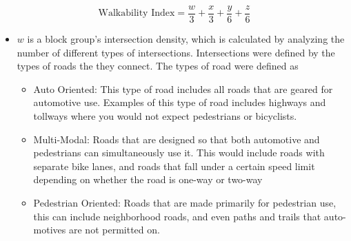 \documentclass[
]{article}
\begin{document}
\[\text{Walkability Index} = \frac{w}{3} + \frac{x}{3} +\frac{y}{6} + \frac{z}{6} \]

\begin{itemize}
\item
  \(w\) is a block group's intersection density, which is calculated by
  analyzing the number of different types of intersections.
  Intersections were defined by the types of roads the they connect. The
  types of road were defined as

  \begin{itemize}
  \item
    Auto Oriented: This type of road includes all roads that are geared
    for automotive use. Examples of this type of road includes highways
    and tollways where you would not expect pedestrians or bicyclists.
  \item
    Multi-Modal: Roads that are designed so that both automotive and
    pedestrians can simultaneously use it. This would include roads with
    separate bike lanes, and roads that fall under a certain speed limit
    depending on whether the road is one-way or two-way
  \item
    Pedestrian Oriented: Roads that are made primarily for pedestrian
    use, this can include neighborhood roads, and even paths and trails
    that auto-motives are not permitted on.
  \end{itemize}


\end{itemize}
\end{document}

